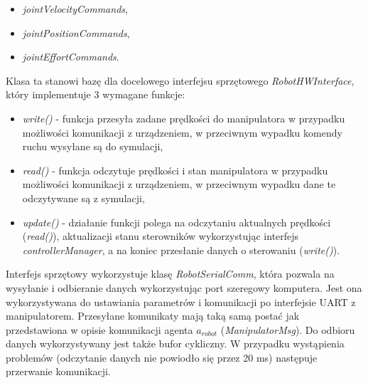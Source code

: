 \documentclass[a4paper, 12pt, twoside]{article}
\begin{document}
\begin{itemize}
\item \textit{jointVelocityCommands},
\item \textit{jointPositionCommands},
\item \textit{jointEffortCommands}.
\end{itemize}

Klasa ta stanowi bazę dla docelowego interfejsu sprzętowego \textit{RobotHWInterface}, który implementuje 3 wymagane funkcje:

\begin{itemize}
\item \textit{write()} - funkcja przesyła zadane prędkości do manipulatora w przypadku możliwości komunikacji z urządzeniem, w przeciwnym wypadku komendy ruchu wysyłane są do symulacji,
\item \textit{read()} - funkcja odczytuje prędkości i stan manipulatora w przypadku możliwości komunikacji z urządzeniem, w przeciwnym wypadku dane te odczytywane są z symulacji,
\item \textit{update()} - działanie funkcji polega na odczytaniu aktualnych prędkości (\textit{read()}), aktualizacji stanu sterowników wykorzystując interfejs \textit{controllerManager}, a na koniec przesłanie danych o sterowaniu (\textit{write()}).
\end{itemize}

Interfejs sprzętowy wykorzystuje klasę \textit{RobotSerialComm}, która pozwala na wysyłanie i odbieranie danych wykorzystując port szeregowy komputera. Jest ona wykorzystywana do ustawiania parametrów i komunikacji po interfejsie UART z manipulatorem. Przesyłane komunikaty mają taką samą postać jak przedstawiona w opisie komunikacji agenta $a_{robot}$ (\textit{ManipulatorMsg}). Do odbioru danych wykorzystywany jest także bufor cykliczny. W przypadku wystąpienia problemów (odczytanie danych nie powiodło się przez 20 ms) następuje przerwanie komunikacji.
\end{document}

